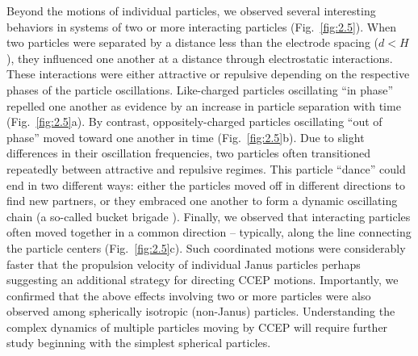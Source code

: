 Beyond the motions of individual particles, we observed several interesting  behaviors in systems of two or more interacting particles (Fig.~\ref{fig:2.5}).
When two particles were separated by a distance less than the electrode spacing ($d<H$), they influenced one another at a distance through electrostatic interactions.
These interactions were either attractive or repulsive depending on the respective phases of the particle oscillations\autocite{mersch2011antiphase}.
Like-charged particles oscillating ``in phase'' repelled one another as evidence by an increase in particle separation with time (Fig.~\ref{fig:2.5}a).
By contrast, oppositely-charged particles oscillating ``out of phase'' moved toward one another in time (Fig.~\ref{fig:2.5}b).
Due to slight differences in their oscillation frequencies, two particles often transitioned repeatedly between attractive and repulsive regimes.
This particle ``dance'' could end in two different ways: either the particles moved off in different directions to find new partners, or they embraced one another to form a dynamic oscillating chain (a so-called bucket brigade \autocite{Pelesko2004a}).
Finally, we observed that interacting particles often moved together in a common direction -- typically, along the line connecting the particle centers (Fig.~\ref{fig:2.5}c).
Such coordinated motions were considerably faster that the propulsion velocity of individual Janus particles perhaps suggesting an additional strategy for directing CCEP motions.
Importantly, we confirmed that the above effects involving two or more particles were also observed among spherically isotropic (non-Janus) particles.
Understanding the complex dynamics of multiple particles moving by CCEP will require further study beginning with the simplest spherical particles.

